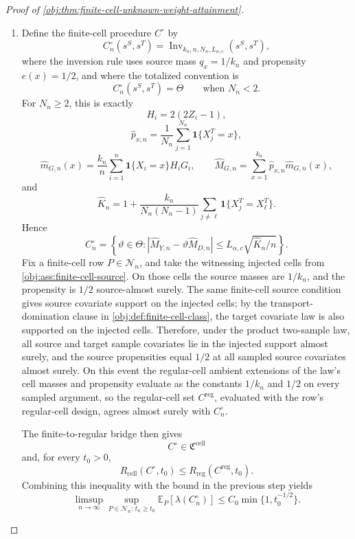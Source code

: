\begin{proof}[Proof of \cref{obj:thm:finite-cell-unknown-weight-attainment}]
\begin{enumerate}
\item
Define the finite-cell procedure \(C^\circ\) by
\[
C^\circ_n(s^S,s^T)
=
\operatorname{Inv}_{k_n,n,N_n,L_{\alpha,c}}(s^S,s^T),
\]
where the inversion rule uses source mass \(q_x=1/k_n\) and propensity \(e(x)=1/2\), and where the totalized convention is
\[
C^\circ_n(s^S,s^T)=\Theta
\qquad\text{when }N_n<2.
\]
For \(N_n\ge2\), this is exactly
\[
H_i=2(2Z_i-1),
\]
\[
\widehat p_{x,n}=\frac1{N_n}\sum_{j=1}^{N_n}\mathbf 1\{X_j^T=x\},
\]
\[
\widehat m_{G,n}(x)
=
\frac{k_n}{n}\sum_{i=1}^n
\mathbf 1\{X_i=x\}H_iG_i,
\qquad
\widehat M_{G,n}
=
\sum_{x=1}^{k_n}\widehat p_{x,n}\widehat m_{G,n}(x),
\]
and
\[
\widehat K_n
=
1+
\frac{k_n}{N_n(N_n-1)}
\sum_{j\ne\ell}\mathbf 1\{X_j^T=X_\ell^T\}.
\]
Hence
\[
C^\circ_n
=
\left\{\vartheta\in\Theta:
|\widehat M_{Y,n}-\vartheta\widehat M_{D,n}|
\le
L_{\alpha,c}\sqrt{\widehat K_n/n}
\right\}.
\]
Fix a finite-cell row \(P\in\mathcal N_n\), and take the witnessing injected cells from \cref{obj:ass:finite-cell-source}.  On those cells the source masses are \(1/k_n\), and the propensity is \(1/2\) source-almost surely.  The same finite-cell source condition gives source covariate support on the injected cells; by the transport-domination clause in \cref{obj:def:finite-cell-class}, the target covariate law is also supported on the injected cells.  Therefore, under the product two-sample law, all source and target sample covariates lie in the injected support almost surely, and the source propensities equal \(1/2\) at all sampled source covariates almost surely.  On this event the regular-cell ambient extensions of the law's cell masses and propensity evaluate as the constants \(1/k_n\) and \(1/2\) on every sampled argument, so the regular-cell set \(C^{\mathrm{reg}}\), evaluated with the row's regular-cell design, agrees almost surely with \(C^\circ_n\).

The finite-to-regular bridge then gives
\[
C^\circ\in\mathfrak C^{\mathrm{cell}}
\]
and, for every \(t_0>0\),
\[
R_{\mathrm{cell}}(C^\circ,t_0)
\le
R_{\mathrm{reg}}(C^{\mathrm{reg}},t_0).
\]
Combining this inequality with the bound in the previous step yields
\[
\limsup_{n\to\infty}
\sup_{P\in\mathcal N_n:\,t_n\ge t_0}
\mathbb E_P[\lambda(C^\circ_n)]
\le
C_0\min\{1,t_0^{-1/2}\}.
\]


\end{enumerate}
\end{proof}
